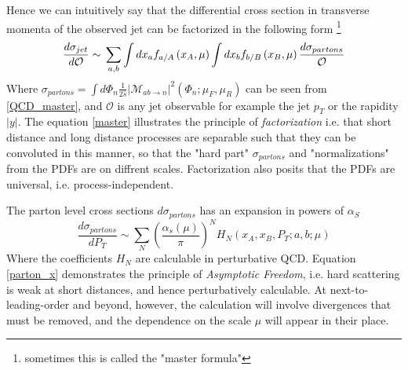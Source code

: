 Hence we can intuitively say that the differential cross section in transverse momenta of the observed jet can be factorized in the following form \footnote{sometimes this is called the "master formula"}
\begin{equation}
\frac{d \sigma_{jet}}{d \mathcal{O}} \sim\\
\sum_{a, b} \int d x_{a} f_{a / A}\left(x_{A}, \mu\right) \int d x_{b} f_{b / B}\left(x_{B}, \mu\right) \frac{d \sigma_{partons}}{\mathcal{O}}
\label{master}
\end{equation}
Where $\sigma_{partons}=\int d \Phi_{n}  \frac{1}{2 \hat{s}}\left|\mathcal{M}_{a b \rightarrow n}\right|^{2}\left(\Phi_{n} ; \mu_{F}, \mu_{R}\right)$ can be seen from \ref{QCD_master}, and $ \mathcal{O}$ is any jet observable for example the jet $p_T$ or the rapidity $|y|$. The equation \ref{master} illustrates the principle of \emph{factorization}  i.e. that short distance and long distance processes are separable such that they can be convoluted in this manner, so that the "hard part" $\sigma_{partons}$ and "normalizations" from the PDFs are on diffrent scales.   Factorization also posits that the PDFs are universal, i.e. process-independent. 


The parton level cross sections $d \sigma_{partons}$ has an expansion in powers of $\alpha_S$
\begin{equation}
    \frac{d \sigma_{partons}}{d P_{T}} \sim \sum_{N}\left(\frac{\alpha_{s}(\mu)}{\pi}\right)^{N} H_{N}\left(x_{A}, x_{B}, P_{T} ; a, b ; \mu\right)
    \label{patron_x}
\end{equation}
Where the coefficients $H_N$ are calculable in perturbative QCD. Equation \ref{parton_x} demonstrates the principle of \emph{Asymptotic Freedom}, i.e. hard scattering is weak at short distances, and hence perturbatively calculable. At next-to-leading-order and beyond, however, the calculation will involve divergences that must be removed, and the dependence on the scale $\mu$ will appear in their place. 
















